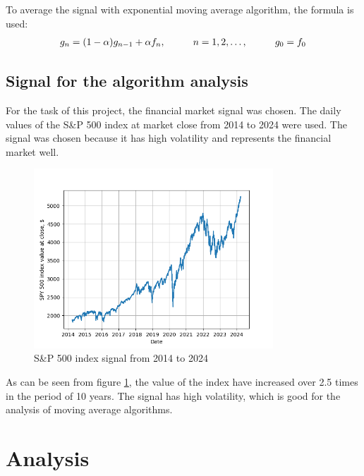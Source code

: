 \documentclass[a4paper,12pt,fleqn]{article}
\begin{document}
        To average the signal with exponential moving average algorithm, 
        the formula is used: \begin{gather}
            g_n = (1-\alpha) g_{n-1} + \alpha f_n, \hspace{1 cm} n = 1, 2, \dots , \hspace{1 cm} g_0 = f_0
        \end{gather}
        
        \subsection{Signal for the algorithm analysis}
        \hspace{1em}For the task of this project, the financial market signal was chosen. The daily values of 
        the S\&P 500 index\cite{SP500} at market close from 2014 to 2024 were used. The signal was chosen because it has
         high volatility and represents the financial market well. 


        \begin{figure}[ht]
            \centering
            \includegraphics[width=0.8\textwidth]{images/SP500.png} %
            \caption{S\&P 500 index signal from 2014 to 2024}
            \label{fig:SP500}
        \end{figure}

        As can be seen from figure \ref{fig:SP500}, the value of the index have increased over 2.5 times in the
        period of 10 years. The signal has high volatility, which is good for the analysis of moving average algorithms.
        
        
        
        \newpage
        \section{Analysis}
\end{document}
